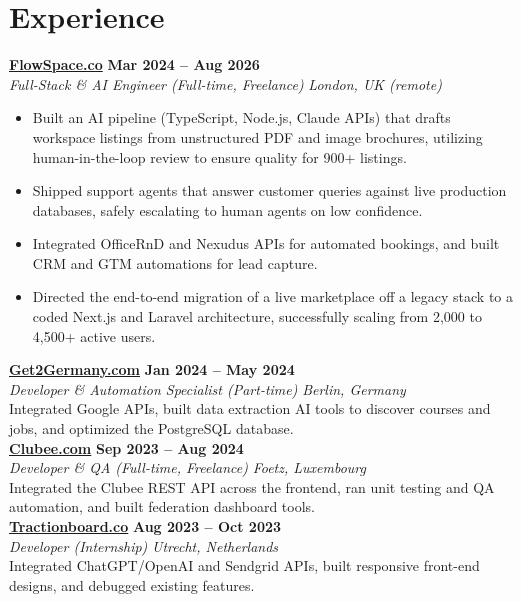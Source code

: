 \documentclass[a4paper,10pt]{article}
\newcommand{\role}[4]{%
 \textbf{#1} \hfill \textbf{#2}\\[1pt]%
 \textit{#3} \hfill \textit{#4}\\[2pt]%
}
\begin{document}
\section{Experience}

\role{\href{https://flowspace.co}{FlowSpace.co}}{Mar 2024 -- Aug 2026}{Full-Stack \& AI Engineer (Full-time, Freelance)}{London, UK (remote)}
\begin{itemize}
 \item Built an AI pipeline (TypeScript, Node.js, Claude APIs) that drafts workspace listings from unstructured PDF and image brochures, utilizing human-in-the-loop review to ensure quality for 900+ listings.
 \item Shipped support agents that answer customer queries against live production databases, safely escalating to human agents on low confidence.
 \item Integrated OfficeRnD and Nexudus APIs for automated bookings, and built CRM and GTM automations for lead capture.
 \item Directed the end-to-end migration of a live marketplace off a legacy stack to a coded Next.js and Laravel architecture, successfully scaling from 2,000 to 4,500+ active users.
\end{itemize}

\role{\href{https://get2germany.com}{Get2Germany.com}}{Jan 2024 -- May 2024}{Developer \& Automation Specialist (Part-time)}{Berlin, Germany}
Integrated Google APIs, built data extraction AI tools to discover courses and jobs, and optimized the PostgreSQL database.\\[1pt]

\role{\href{https://clubee.com}{Clubee.com}}{Sep 2023 -- Aug 2024}{Developer \& QA (Full-time, Freelance)}{Foetz, Luxembourg}
Integrated the Clubee REST API across the frontend, ran unit testing and QA automation, and built federation dashboard tools.\\[1pt]

\role{\href{https://tractionboard.co}{Tractionboard.co}}{Aug 2023 -- Oct 2023}{Developer (Internship)}{Utrecht, Netherlands}
Integrated ChatGPT/OpenAI and Sendgrid APIs, built responsive front-end designs, and debugged existing features.

\end{document}
